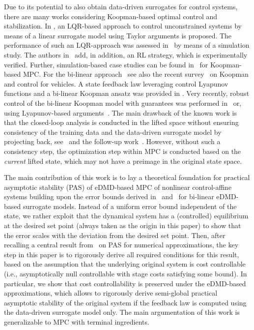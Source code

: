 \documentclass{article}
\numberwithin{equation}{section}
\begin{document}
	Due to its potential to also obtain data-driven surrogates for control systems, there are many works considering Koopman-based optimal control and stabilization. In \cite{MamaCast21}, an LQR-based approach to control unconstrained systems by means of a linear surrogate model using Taylor arguments is proposed. 
	The performance of such an LQR-approach was assessed in~\cite{MaHuan19} by means of a simulation study. 
	The authors in~\cite{IwatKawa21} add, in addition, an RL strategy, which is experimentally verified. 
	Further, simulation-based case studies can be found in~\cite{YuShen22} for Koopman-based MPC. For the bi-linear approach~\cite{KanaYama22} see also the recent survey~\cite{ManzRawa23} on Koopman and control for vehicles.
	A state feedback law leveraging control Lyapunov functions and a bi-linear Koopman ansatz was provided in \cite{SinhNand22}. 
	Very recently, robust control of the bi-linear Koopman model with guarantees was performed in~\cite{StraBerb23} or, using Lyapunov-based arguments~\cite{SonNara22,NaraSon23}. 
	The main drawback of the known work is that the closed-loop analysis is conducted in the lifted space without ensuring consistency of the training data and the data-driven surrogate model by projecting back, see~\cite{MaurGonc16} and the follow-up work~\cite{GoorMaho23}. 
	However, without such a consistency step, the optimization step within MPC is conducted based on the \emph{current} lifted state, which may not have a preimage in the original state space.
	
	The main contribution of this work is to lay a theoretical foundation for practical asymptotic stability (PAS) of eDMD-based MPC of nonlinear control-affine systems building upon the error bounds derived in~\cite{NuskPeit23} and~\cite{SchaWort23} for bi-linear eDMD-based surrogate models.
	Instead of a uniform error bound independent of the state, we rather exploit that the dynamical system has a (controlled) equilibrium at the desired set point (always taken as the origin in this paper) to show that the error scales with the deviation from the desired set point. 
	Then, after recalling a central result from~\cite{GrunPann17} on PAS for numerical approximations, the key step in this paper is to rigorously derive all required conditions for this result, based on the assumption that the underlying original system is cost controllable (i.e., asymptotically null controllable with stage costs satisfying some bound). 
	In particular, we show that cost controllability is preserved under the eDMD-based approximations, which allows to rigorously derive semi-global practical asymptotic stability of the original system if the feedback law is computed using the data-driven surrogate model only. The main argumentation of this work is generalizable to MPC with terminal ingredients.
	\\
	
\end{document}
